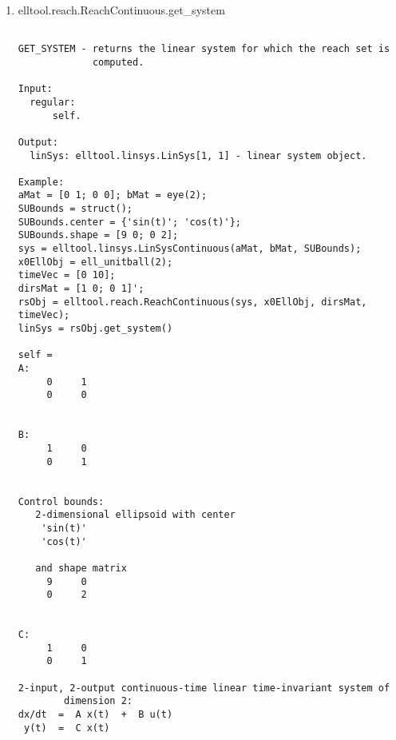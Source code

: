 \begin{enumerate}
\begin{lstlisting}
GET_DIRECTIONS - returns the values of direction vectors for time grid
                 values.

Input:
  regular:
      self.

Output:
  directionsCVec: cell[1, nPoints] of double [nDim, nDir] - array of
      cells, where each cell is a sequence of direction vector values
      that correspond to the time values of the grid, where nPoints is
      number of points in time grid.

  timeVec: double[1, nPoints] - array of time values.

Example:
aMat = [0 1; 0 0]; bMat = eye(2);
SUBounds = struct();
SUBounds.center = {'sin(t)'; 'cos(t)'};
SUBounds.shape = [9 0; 0 2];
sys = elltool.linsys.LinSysContinuous(aMat, bMat, SUBounds);
x0EllObj = ell_unitball(2);
timeVec = [0 10];
dirsMat = [1 0; 0 1]';
rsObj = elltool.reach.ReachContinuous(sys, x0EllObj, dirsMat, timeVec);
[directionsCVec timeVec] = rsObj.get_directions();





\end{lstlisting}
\fontfamily{\familydefault}
\selectfont
\item {elltool.reach.ReachContinuous.get\_system}
\selectfont
\begin{lstlisting}

GET_SYSTEM - returns the linear system for which the reach set is
             computed.

Input:
  regular:
      self.

Output:
  linSys: elltool.linsys.LinSys[1, 1] - linear system object.

Example:
aMat = [0 1; 0 0]; bMat = eye(2);
SUBounds = struct();
SUBounds.center = {'sin(t)'; 'cos(t)'};
SUBounds.shape = [9 0; 0 2];
sys = elltool.linsys.LinSysContinuous(aMat, bMat, SUBounds);
x0EllObj = ell_unitball(2);
timeVec = [0 10];
dirsMat = [1 0; 0 1]';
rsObj = elltool.reach.ReachContinuous(sys, x0EllObj, dirsMat, timeVec);
linSys = rsObj.get_system()

self =
A:
     0     1
     0     0


B:
     1     0
     0     1


Control bounds:
   2-dimensional ellipsoid with center
    'sin(t)'
    'cos(t)'

   and shape matrix
     9     0
     0     2


C:
     1     0
     0     1

2-input, 2-output continuous-time linear time-invariant system of
        dimension 2:
dx/dt  =  A x(t)  +  B u(t)
 y(t)  =  C x(t)


\end{lstlisting}
\end{enumerate}
